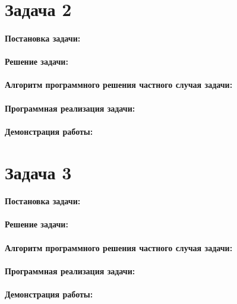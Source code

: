{
    \section*{Задача 2}
    \paragraph{Постановка задачи:}
    \paragraph{Решение задачи:}
    \paragraph{Алгоритм программного решения частного случая задачи:}
    \paragraph{Программная реализация задачи:}
    \paragraph{Демонстрация работы:}
}
{
    \section*{Задача 3}
    \paragraph{Постановка задачи:}
    \paragraph{Решение задачи:}
    \paragraph{Алгоритм программного решения частного случая задачи:}
    \paragraph{Программная реализация задачи:}
    \paragraph{Демонстрация работы:}
}

